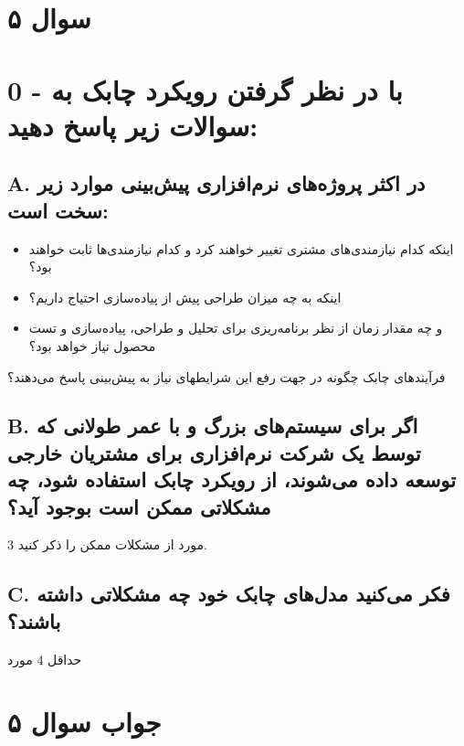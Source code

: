 \section*{سوال ۵}

\section*{0 - با در نظر گرفتن رویکرد چابک به سوالات زیر پاسخ دهید:}
\subsection*{A. در اکثر پروژه‌های نرم‌افزاری پیش‌بینی موارد زیر سخت است:}
\begin{itemize}
	\item اینکه کدام نیازمندی‌های مشتری تغییر خواهند کرد و کدام نیازمندی‌ها ثابت خواهند بود؟
	\item اینکه به چه میزان طراحی پیش از پیاده‌سازی احتیاج داریم؟
	\item و چه مقدار زمان از نظر برنامه‌ریزی برای تحلیل و طراحی، پیاده‌سازی و تست محصول نیاز خواهد بود؟
\end{itemize}
فرآیندهای چابک چگونه در جهت رفع این شرایطهای نیاز به پیش‌بینی پاسخ می‌دهند؟

\subsection*{B. اگر برای سیستم‌های بزرگ و با عمر طولانی که توسط یک شرکت نرم‌افزاری برای مشتریان خارجی توسعه داده می‌شوند، از رویکرد چابک استفاده شود، چه مشکلاتی ممکن است بوجود آید؟}
3 مورد از مشکلات ممکن را ذکر کنید.

\subsection*{C. فکر می‌کنید مدل‌های چابک خود چه مشکلاتی داشته باشند؟}
حداقل 4 مورد

\section*{جواب سوال ۵}

